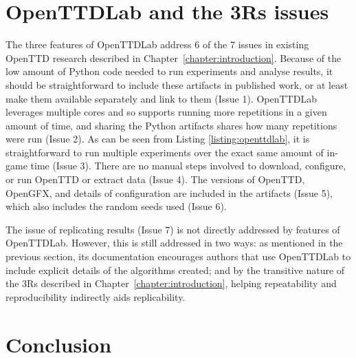 \documentclass[logo,msc,dsti]{style/infthesis}    %
\begin{document}
{%

\section{OpenTTDLab and the 3Rs issues}

The three features of OpenTTDLab address 6 of the 7 issues in existing OpenTTD research described in Chapter~\ref{chapter:introduction}. Because of the low amount of Python code needed to run experiments and analyse results, it should be straightforward to include these artifacts in published work, or at least make them available separately and link to them (Issue 1). OpenTTDLab leverages multiple cores and so supports running more repetitions in a given amount of time, and sharing the Python artifacts shares how many repetitions were run (Issue 2). As can be seen from Listing \ref{listing:openttdlab}, it is straightforward to run multiple experiments  over the exact same amount of in-game time (Issue 3). There are no manual steps involved to download, configure, or run OpenTTD or extract data (Issue 4). The versions of OpenTTD, OpenGFX, and details of configuration are included in the artifacts (Issue 5), which also includes the random seeds used (Issue 6).

The issue of replicating results (Issue 7) is not directly addressed by features of OpenTTDLab. However, this is still addressed in two ways: as mentioned in the previous section, its documentation encourages authors that use OpenTTDLab to include explicit details of the algorithms created; and by the transitive nature of the 3Rs described in Chapter~\ref{chapter:introduction}, helping repeatability and reproducibility indirectly aids replicability.

\section{Conclusion}

}
\end{document}
